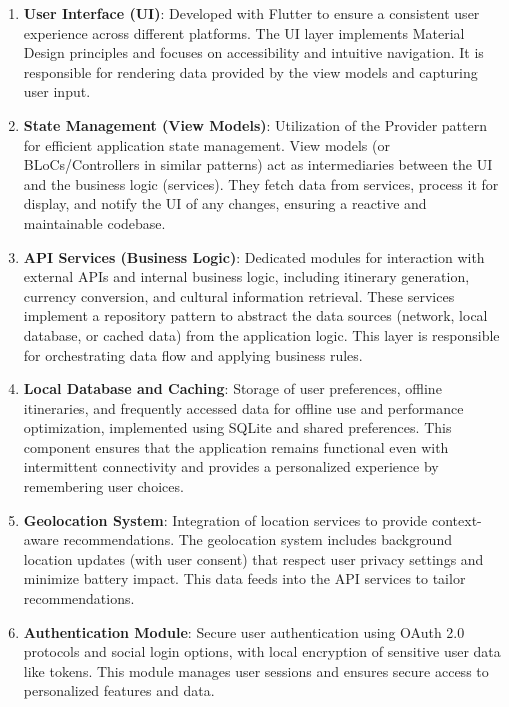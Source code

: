 \documentclass[11pt, a4paper]{article}
\begin{document}
\begin{enumerate}
    \item \textbf{User Interface (UI)}: Developed with Flutter to ensure a consistent user experience across different platforms. The UI layer implements Material Design principles and focuses on accessibility and intuitive navigation. It is responsible for rendering data provided by the view models and capturing user input.
    
    \item \textbf{State Management (View Models)}: Utilization of the Provider pattern for efficient application state management. View models (or BLoCs/Controllers in similar patterns) act as intermediaries between the UI and the business logic (services). They fetch data from services, process it for display, and notify the UI of any changes, ensuring a reactive and maintainable codebase.
    
    \item \textbf{API Services (Business Logic)}: Dedicated modules for interaction with external APIs and internal business logic, including itinerary generation, currency conversion, and cultural information retrieval. These services implement a repository pattern to abstract the data sources (network, local database, or cached data) from the application logic. This layer is responsible for orchestrating data flow and applying business rules.
    
    \item \textbf{Local Database and Caching}: Storage of user preferences, offline itineraries, and frequently accessed data for offline use and performance optimization, implemented using SQLite and shared preferences. This component ensures that the application remains functional even with intermittent connectivity and provides a personalized experience by remembering user choices.
    
    \item \textbf{Geolocation System}: Integration of location services to provide context-aware recommendations. The geolocation system includes background location updates (with user consent) that respect user privacy settings and minimize battery impact. This data feeds into the API services to tailor recommendations.
    
    \item \textbf{Authentication Module}: Secure user authentication using OAuth 2.0 protocols and social login options, with local encryption of sensitive user data like tokens. This module manages user sessions and ensures secure access to personalized features and data.
\end{enumerate}
\end{document}
